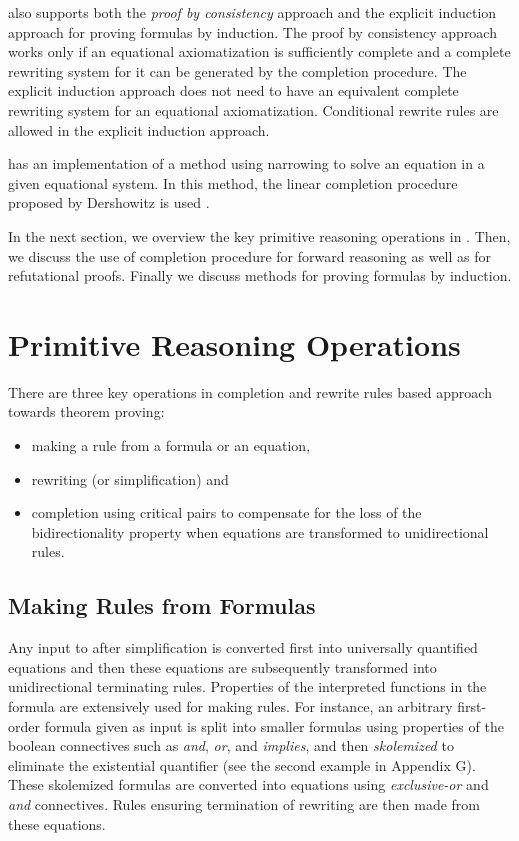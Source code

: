 \RRL also supports both the {\it proof by consistency} approach
and the explicit induction approach for proving formulas by
induction.  The proof by consistency approach works only if an
equational axiomatization is sufficiently complete and a complete
rewriting system for it can be generated by the completion
procedure. The explicit induction approach does not need to have
an equivalent complete rewriting system for an equational
axiomatization.  Conditional rewrite rules are allowed in the
explicit induction approach.

\RRL has an implementation of a method using narrowing to 
solve an equation in a
given equational system. In this method, the linear completion
procedure proposed by Dershowitz is used \cite{Dershowitz85}.

In the next section, we overview the key primitive reasoning
operations in \RRL.  Then, we discuss the use of completion
procedure for forward reasoning as well as for refutational
proofs. Finally we discuss methods for proving formulas by
induction.

\section{Primitive Reasoning Operations}

There are three key operations in completion and rewrite rules based approach towards theorem proving:
\begin{itemize}
\item
making a rule from a formula or an equation,
\item
rewriting (or simplification) and 
\item
completion using critical pairs
to compensate for the loss of the bidirectionality property when
equations are transformed to unidirectional rules. 
\end{itemize}

\subsection{Making Rules from Formulas}

Any input to \RRL after simplification is converted first into
universally quantified equations and then these equations are
subsequently transformed into unidirectional terminating rules.
Properties of the interpreted functions in the formula are extensively
used for making rules. For instance, an arbitrary first-order formula
given as input is split into smaller formulas using properties of the
boolean connectives such as {\em and}, {\em or}, and {\em implies}, and then
{\em skolemized}
to eliminate the existential quantifier (see the second 
example in Appendix G).  
These skolemized formulas are converted into equations
using {\em exclusive-or} and {\em and} connectives. Rules
ensuring termination of rewriting are then made from these
equations.
  
